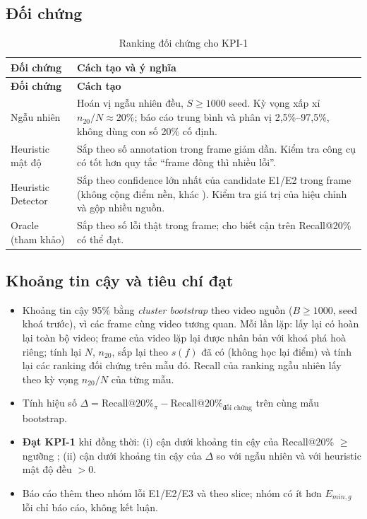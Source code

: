 \subsection{Đối chứng}
\begin{xltabular}{\linewidth}{@{}L{3.4cm}Y@{}}
\caption{Ranking đối chứng cho KPI-1}\label{tab:baselines1}\\
\toprule
\textbf{Đối chứng} & \textbf{Cách tạo và ý nghĩa}\\
\midrule
\endfirsthead
\toprule \textbf{Đối chứng} & \textbf{Cách tạo}\\ \midrule
\endhead
\bottomrule
\endfoot
Ngẫu nhiên & Hoán vị ngẫu nhiên đều, \(S \ge 1000\) seed. Kỳ vọng xấp xỉ \(n_{20}/N \approx 20\%\); báo cáo trung bình và phân vị 2{,}5\%–97{,}5\%, không dùng con số 20\% cố định.\\
Heuristic mật độ & Sắp theo số annotation trong frame giảm dần. Kiểm tra công cụ có tốt hơn quy tắc ``frame đông thì nhiều lỗi''.\\
Heuristic Detector & Sắp theo confidence lớn nhất của candidate E1/E2 trong frame (không cộng điểm nền, khác ). Kiểm tra giá trị của hiệu chỉnh và gộp nhiều nguồn.\\
Oracle (tham khảo) & Sắp theo số lỗi thật trong frame; cho biết cận trên Recall@20\% có thể đạt.\\
\end{xltabular}

\subsection{Khoảng tin cậy và tiêu chí đạt}
\begin{itemize}
  \item Khoảng tin cậy 95\% bằng \emph{cluster bootstrap} theo video nguồn
        (\(B \ge 1000\), seed khoá trước), vì các frame cùng video tương quan.
        Mỗi lần lặp: lấy lại có hoàn lại toàn bộ video; frame của video lặp lại
        được nhân bản với khoá phá hoà riêng; tính lại \(N\), \(n_{20}\), sắp lại
        theo \(s(f)\) đã có (không học lại điểm) và tính lại các ranking đối chứng
        trên mẫu đó. Recall của ranking ngẫu nhiên lấy theo kỳ vọng \(n_{20}/N\)
        của từng mẫu.
  \item Tính hiệu số \(\Delta = \mathrm{Recall@20\%}_{\pi} - \mathrm{Recall@20\%}_{\text{đối chứng}}\)
        trên cùng mẫu bootstrap.
  \item \textbf{Đạt KPI-1} khi đồng thời: (i) cận dưới khoảng tin cậy của
        Recall@20\% $\ge$ ngưỡng \TBD[-K1]; (ii) cận dưới khoảng tin cậy của
        \(\Delta\) so với ngẫu nhiên và với heuristic mật độ đều \(> 0\).
  \item Báo cáo thêm theo nhóm lỗi E1/E2/E3 và theo slice; nhóm có ít hơn
        \(E_{min,g}\) lỗi chỉ báo cáo, không kết luận.
\end{itemize}

